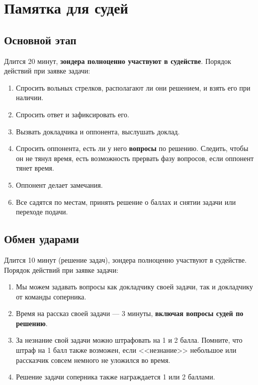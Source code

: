 \documentclass[12pt]{article}
\begin{document}
\section*{Памятка для судей}
\subsection*{Основной этап}
Длится 20 минут, {\bf зондера полноценно участвуют в судействе}.
Порядок действий при заявке задачи:
\begin{enumerate}
	\item Спросить вольных стрелков, располагают ли они решением, и взять его при наличии.
	\item Спросить ответ и зафиксировать его.
	\item Вызвать докладчика и оппонента, выслушать доклад.
	\item Спросить оппонента, есть ли у него {\bf вопросы} по решению. Следить, чтобы он не тянул время, есть возможность прервать фазу вопросов, если оппонент тянет время.
	\item Оппонент делает замечания.
	\item Все садятся по местам, принять решение о баллах и снятии задачи или переходе подачи.
\end{enumerate}

\subsection*{Обмен ударами}
Длится 10 минут (решение задач), зондера полноценно участвуют в судействе.
Порядок действий при заявке задачи:
\begin{enumerate}
	\item Мы можем задавать вопросы как докладчику своей задачи, так и докладчику от команды соперника.
	\item Время на рассказ своей задачи --- 3 минуты, {\bf включая вопросы судей по решению}.
	\item За незнание свой задачи можно штрафовать на 1 и 2 балла. Помните, что штраф на 1 балл также возможен, если <<незнание>> небольшое или рассказчик совсем немного не уложился во время.
	\item Решение задачи соперника также награждается 1 или 2 баллами.
\end{enumerate}
\end{document}
